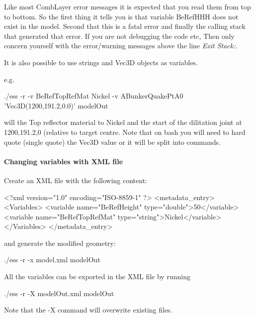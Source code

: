 Like most CombLayer error messages it is expected that you read them from top to bottom. So the first thing it tells you is
that variable BeRefHHH does not exist in the model. Second that this is a fatal error and finally the calling stack that generated
that error. If you are not debugging the code etc, Then only concern yourself with the error/warning messages above the line {\it Exit Stack:}.


It is also possible to use strings and Vec3D objects as variables.

e.g.

\begin{bash}
  ./ess -r -v BeRefTopRefMat Nickel -v ABunkerQuakePtA0 'Vec3D(1200,191.2,0.0)' modelOut
\end{bash}

will the Top reflector material to Nickel and the start of the dilitation joint at 1200,191.2,0 (relative to
target centre. Note that on bash you will need to hard quote (single quote) the Vec3D value or it will
be split into commands.


\paragraph[XML file]{Changing variables with XML file}
Create an XML file with the following content:

\begin{xml}
<?xml version="1.0" encoding="ISO-8859-1" ?>
<metadata_entry>
  <Variables>
  <variable name="BeRefHeight" type="double">50</variable>
  <variable name="BeRefTopRefMat" type="string">Nickel</variable>
  </Variables>
</metadata_entry>
\end{xml}

and generate the modified geometry:
\begin{bash}
  ./ess -r -x model.xml modelOut
\end{bash}

All the variables can be exported in the XML file by running
\begin{bash}
  ./ess -r -X modelOut.xml modelOut
\end{bash}

Note that the -X command will overwrite existing files.
